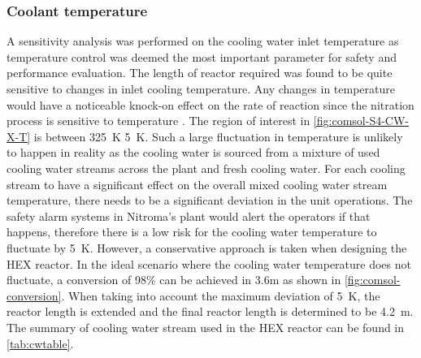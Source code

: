 \subsubsection{Coolant temperature}
\label{sec:coolanttemp}
A sensitivity analysis was performed on the cooling water inlet temperature as temperature control was deemed the most important parameter for safety and performance evaluation. The length of reactor required was found to be quite sensitive to changes in inlet cooling temperature. Any changes in temperature would have a noticeable knock-on effect on the rate of reaction since the nitration process is sensitive to temperature \cite{chen_experimental_1998}. The region of interest in \cref{fig:comsol-S4-CW-X-T} is between \SI{325}{\K} \pm \SI{5}{\K}. Such a large fluctuation in temperature is unlikely to happen in reality as the cooling water is sourced from a mixture of used cooling water streams across the plant and fresh cooling water. For each cooling stream to have a significant effect on the overall mixed cooling water stream temperature, there needs to be a significant deviation in the unit operations. The safety alarm systems in Nitroma's plant would alert the operators if that happens, therefore there is a low risk for the cooling water temperature to fluctuate by \pm \SI{5}{\K}. However, a conservative approach is taken when designing the HEX reactor. In the ideal scenario where the cooling water temperature does not fluctuate, a conversion of 98\% can be achieved in 3.6m as shown in \cref{fig:comsol-conversion}. When taking into account the maximum deviation of \pm \SI{5}{\K}, the reactor length is extended and the final reactor length is determined to be \SI{4.2}{\metre}. The summary of cooling water stream used in the HEX reactor can be found in \cref{tab:cwtable}.

